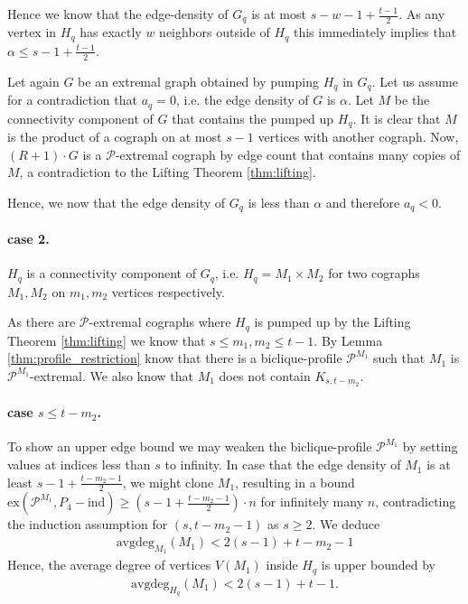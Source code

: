 \documentclass{article}
\theoremstyle{definition}
\theoremstyle{definition}
\theoremstyle{definition}
\theoremstyle{definition}
\theoremstyle{definition}
\theoremstyle{definition}
\theoremstyle{definition}
\theoremstyle{definition}
\theoremstyle{definition}
\theoremstyle{definition}
\begin{document}
        Hence we know that the edge-density of $G_q$ is at most $s - w - 1 + \frac{t-1}{2}$. As any vertex in $H_q$ has exactly $w$ neighbors outside of $H_q$ this immediately implies that $\alpha \leq s -1 + \frac{t-1}{2}$.

        Let again $G$ be an extremal graph obtained by pumping $H_q$ in $G_q$. Let us assume for a contradiction that $a_q = 0$, i.e. the edge density of $G$ is $\alpha$.
        Let $M$ be the connectivity component of $G$ that contains the pumped up $H_q$. It is clear that $M$ is the product of a cograph on at most $s-1$ vertices with another cograph.
        Now, $(R+1) \cdot G$ is a $\mathscr{P}$-extremal cograph by edge count that contains many copies of $M$, a contradiction to the Lifting Theorem \ref{thm:lifting}.

        Hence, we now that the edge density of $G_q$ is less than $\alpha$ and therefore $a_q < 0$.

    \paragraph{case 2.}
        $H_q$ is a connectivity component of $G_q$, i.e. $H_q = M_{1} \times M_{2}$ for two cographs $M_1, M_2$ on $m_1, m_2$ vertices respectively.
        
        As there are $\mathscr{P}$-extremal cographs where $H_q$ is pumped up by the Lifting Theorem \ref{thm:lifting} we know that $s \leq m_1, m_2 \leq t-1$.
        By Lemma \ref{thm:profile_restriction} know that there is a biclique-profile $\mathscr{P}^{M_1}$ such that $M_1$ is $\mathscr{P}^{M_1}$-extremal. We also know that $M_1$ does not contain $K_{s,t-m_2}$.

        \paragraph{case $s \leq t - m_2$.}
            To show an upper edge bound we may weaken the biclique-profile $\mathscr{P}^{M_1}$ by setting values at indices less than $s$ to infinity.
            In case that the edge density of $M_1$ is at least $s - 1 + \frac{t - m_2 - 1}{2}$, we might clone $M_1$, resulting in a bound $\text{ex}\left( \mathscr{P}^{M_1}, P_4 - \text{ind} \right) \geq (s - 1 + \frac{t - m_2 - 1}{2}) \cdot n$ for infinitely many $n$, contradicting the induction assumption for $(s,t-m_2-1)$ as $s \geq 2$. We deduce
            \begin{align}
                \text{avgdeg}_{M_1}(M_1) < 2(s-1) + t-m_2-1
            \end{align}
            Hence, the average degree of vertices $V(M_1)$ inside $H_q$ is upper bounded by
            \begin{align}
                \text{avgdeg}_{H_q}(M_1) < 2(s-1) + t-1.
            \end{align}
\end{document}
